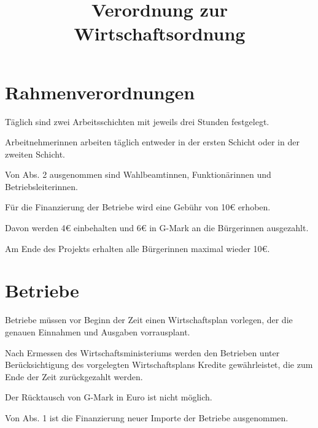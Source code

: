 \documentclass{sasbase}
\begin{document}
\title{Verordnung zur Wirtschaftsordnung}

\setcounter{secnumdepth}{5}

\mytitle

\parensstyle

\section{Rahmenverordnungen}

\begin{lawparagraph}[Schichten]
	\item Täglich sind zwei Arbeitsschichten mit jeweils drei Stunden festgelegt.
    \item Arbeitnehmerinnen arbeiten täglich entweder in der ersten Schicht oder in der
        zweiten Schicht.
    \item Von Abs. 2 ausgenommen sind Wahlbeamtinnen, Funktionärinnen und Betriebsleiterinnen.
\end{lawparagraph}

\begin{lawparagraph}[Rahmenfinanzierung]
    \item Für die Finanzierung der Betriebe wird eine Gebühr von 10€ erhoben.
    \item Davon werden 4€ einbehalten und 6€ in G-Mark an die Bürgerinnen ausgezahlt.
    \item Am Ende des Projekts erhalten alle Bürgerinnen maximal wieder 10€.
\end{lawparagraph}

\section{Betriebe}

\begin{lawparagraph}[Betriebskredite]
    \item Betriebe müssen vor Beginn der Zeit einen Wirtschaftsplan vorlegen, der die genauen
        Einnahmen und Ausgaben vorrausplant.
    \item Nach Ermessen des Wirtschaftsministeriums werden den Betrieben unter Berücksichtigung
        des vorgelegten Wirtschaftsplans Kredite gewährleistet, die zum Ende der Zeit zurückgezahlt
        werden.
\end{lawparagraph}

\begin{lawparagraph}
    \item Der Rücktausch von G-Mark in Euro ist nicht möglich.
    \item Von Abs. 1 ist die Finanzierung neuer Importe der Betriebe ausgenommen.
\end{lawparagraph}
\end{document}
